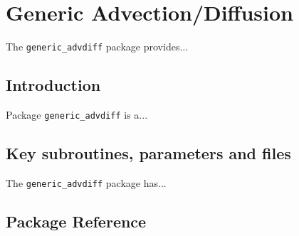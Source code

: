 

\section{Generic Advection/Diffusion}
\label{sec:pkg:gad}
The {\tt generic\_advdiff} package provides...


\subsection{Introduction}
Package {\tt generic\_advdiff} is a...


\subsection{Key subroutines, parameters and files}
\label{sec:pkg:rw:implementation_synopsis}
The {\tt generic\_advdiff} package has... 


\subsection{Package Reference}

%


